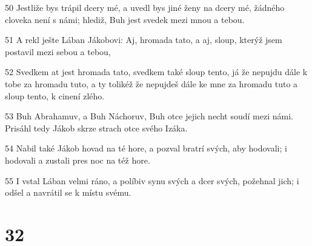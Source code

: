 \par 50 Jestliže bys trápil dcery mé, a uvedl bys jiné ženy na dcery mé, žádného cloveka není s námi; hlediž, Buh jest svedek mezi mnou a tebou.
\par 51 A rekl ješte Lában Jákobovi: Aj, hromada tato, a aj, sloup, kterýž jsem postavil mezi sebou a tebou,
\par 52 Svedkem at jest hromada tato, svedkem také sloup tento, já že nepujdu dále k tobe za hromadu tuto, a ty tolikéž že nepujdeš dále ke mne za hromadu tuto a sloup tento, k cinení zlého.
\par 53 Buh Abrahamuv, a Buh Náchoruv, Buh otce jejich necht soudí mezi námi. Prisáhl tedy Jákob skrze strach otce svého Izáka.
\par 54 Nabil také Jákob hovad na té hore, a pozval bratrí svých, aby hodovali; i hodovali a zustali pres noc na též hore.
\par 55 I vstal Lában velmi ráno, a políbiv synu svých a dcer svých, požehnal jich; i odšel a navrátil se k místu svému.

\chapter{32}

